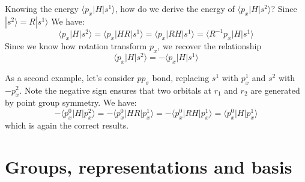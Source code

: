 \documentclass{article}
\begin{document}
Knowing the energy $\langle p_x | H | s^1 \rangle$, how do we derive the energy 
of $\langle p_x | H | s^2 \rangle$? Since $| s^2 \rangle = R | s^1 \rangle$ We have:
\begin{equation}
    \langle p_x | H | s^2 \rangle = \langle p_x | H R | s^1 \rangle
    = \langle p_x | R H | s^1 \rangle = \langle R^{-1} p_x | H | s^1 \rangle
\end{equation}
Since we know how rotation transform $p_x$, we recover the relationship 
\begin{equation}
    \langle p_x | H | s^2 \rangle = - \langle p_x | H | s^1 \rangle
\end{equation}

As a second example, let's consider $pp_{\sigma}$ bond, replacing $s^1$ with $p_x^1$ 
and $s^2$ with $-p_x^2$. Note the negative sign ensures that two orbitals at $r_1$ and $r_2$
are generated by point group symmetry. 
We have:
\begin{equation}
    - \langle p_x^0 | H | p_x^2 \rangle =  - \langle p_x^0 | HR | p_x^1 \rangle 
    = - \langle p_x^0 | RH | p_x^1 \rangle = \langle p_x^0 | H | p_x^1 \rangle
\end{equation} 
which is again the correct results. 



\newpage
\appendix

\section{Groups, representations and basis}
\end{document}
